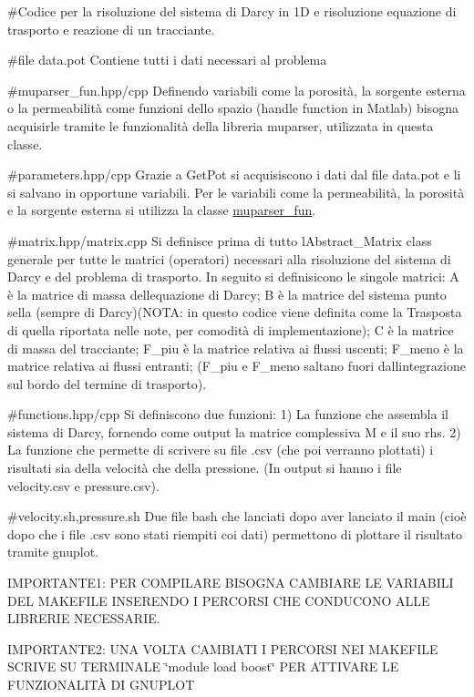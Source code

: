 \#\+Codice per la risoluzione del sistema di Darcy in 1D e risoluzione equazione di trasporto e reazione di un tracciante.

\#file data.\+pot Contiene tutti i dati necessari al problema

\#muparser\+\_\+fun.\+hpp/cpp Definendo variabili come la porosità, la sorgente esterna o la permeabilità come funzioni dello spazio (handle function in Matlab) bisogna acquisirle tramite le funzionalità della libreria muparser, utilizzata in questa classe.

\#parameters.\+hpp/cpp Grazie a Get\+Pot si acquisiscono i dati dal file data.\+pot e li si salvano in opportune variabili. Per le variabili come la permeabilità, la porosità e la sorgente esterna si utilizza la classe \hyperlink{classmuparser__fun}{muparser\+\_\+fun}.

\#matrix.\+hpp/matrix.cpp Si definisce prima di tutto l\textquotesingle{}Abstract\+\_\+\+Matrix class generale per tutte le matrici (operatori) necessari alla risoluzione del sistema di Darcy e del problema di trasporto. In seguito si definisicono le singole matrici\+: A è la matrice di massa dell\textquotesingle{}equazione di Darcy; B è la matrice del sistema punto sella (sempre di Darcy)(N\+O\+TA\+: in questo codice viene definita come la Trasposta di quella riportata nelle note, per comodità di implementazione); C è la matrice di massa del tracciante; F\+\_\+piu è la matrice relativa ai flussi uscenti; F\+\_\+meno è la matrice relativa ai flussi entranti; (F\+\_\+piu e F\+\_\+meno saltano fuori dall\textquotesingle{}integrazione sul bordo del termine di trasporto).

\#functions.\+hpp/cpp Si definiscono due funzioni\+: 1) La funzione che assembla il sistema di Darcy, fornendo come output la matrice complessiva M e il suo rhs. 2) La funzione che permette di scrivere su file .csv (che poi verranno plottati) i risultati sia della velocità che della pressione. (In output si hanno i file velocity.\+csv e pressure.\+csv).

\#velocity.\+sh,pressure.\+sh Due file bash che lanciati dopo aver lanciato il main (cioè dopo che i file .csv sono stati riempiti coi dati) permettono di plottare il risultato tramite gnuplot.

I\+M\+P\+O\+R\+T\+A\+N\+T\+E1\+: P\+ER C\+O\+M\+P\+I\+L\+A\+RE B\+I\+S\+O\+G\+NA C\+A\+M\+B\+I\+A\+RE LE V\+A\+R\+I\+A\+B\+I\+LI D\+EL M\+A\+K\+E\+F\+I\+LE I\+N\+S\+E\+R\+E\+N\+DO I P\+E\+R\+C\+O\+R\+SI C\+HE C\+O\+N\+D\+U\+C\+O\+NO A\+L\+LE L\+I\+B\+R\+E\+R\+IE N\+E\+C\+E\+S\+S\+A\+R\+IE.

I\+M\+P\+O\+R\+T\+A\+N\+T\+E2\+: U\+NA V\+O\+L\+TA C\+A\+M\+B\+I\+A\+TI I P\+E\+R\+C\+O\+R\+SI N\+EI M\+A\+K\+E\+F\+I\+LE S\+C\+R\+I\+VE SU T\+E\+R\+M\+I\+N\+A\+LE \char`\"{}module load boost\char`\"{} P\+ER A\+T\+T\+I\+V\+A\+RE LE F\+U\+N\+Z\+I\+O\+N\+A\+L\+I\+TÀ DI G\+N\+U\+P\+L\+OT 